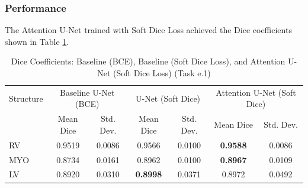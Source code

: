 \documentclass{article}
\begin{document}
\subsubsection{Performance}
The Attention U-Net trained with Soft Dice Loss achieved the Dice coefficients shown in Table \ref{tab:attention_unet_comparison}.
\begin{table}[H]
  \centering
  \caption{Dice Coefficients: Baseline (BCE), Baseline (Soft Dice Loss), and Attention U-Net (Soft Dice Loss) (Task e.1)}
  \label{tab:attention_unet_comparison}
  \begin{tabular}{l|cc|cc|cc}
    \toprule
    Structure & \multicolumn{2}{c|}{Baseline U-Net (BCE)} & \multicolumn{2}{c|}{U-Net (Soft Dice)} & \multicolumn{2}{c}{Attention U-Net (Soft Dice)}                                           \\
              & Mean Dice                                 & Std. Dev.                              & Mean Dice                                       & Std. Dev. & Mean Dice       & Std. Dev. \\
    \midrule
    RV        & 0.9519                                    & 0.0086                                 & 0.9566                                          & 0.0100    & \textbf{0.9588} & 0.0086    \\
    MYO       & 0.8734                                    & 0.0161                                 & 0.8962                                          & 0.0100    & \textbf{0.8967} & 0.0109    \\
    LV        & 0.8920                                    & 0.0310                                 & \textbf{0.8998}                                 & 0.0371    & 0.8972          & 0.0492    \\
    \bottomrule
  \end{tabular}
\end{table}
\end{document}
